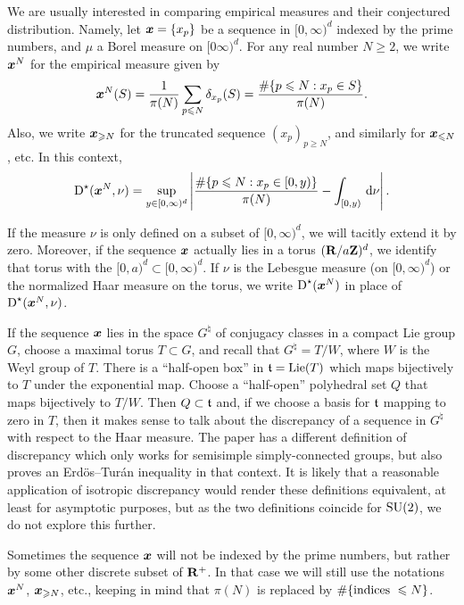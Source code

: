 We are usually interested in comparing empirical measures and their conjectured 
distribution. Namely, let ${\boldsymbol x} = \{x_p\}$ be a sequence in $[0,\infty)^d$ 
indexed by the prime numbers, and $\mu$ a Borel measure on $[0\infty)^d$. For 
any real number $N\geqslant 2$, we write ${\boldsymbol x}^N$ for the empirical measure 
given by 
\[
	{\boldsymbol x}^N(S) = \frac{1}{\pi(N)} \sum_{p\leqslant N} \delta_{x_p}(S) = \frac{\# \{p\leqslant N : x_p\in S\}}{\pi(N)} .
\]
Also, we write ${\boldsymbol x}_{\geqslant N}$ for the truncated sequence 
$(x_p)_{p\geqslant N}$, and similarly for ${\boldsymbol x}_{\leqslant N}$, etc. In this 
context, 
\[
	\operatorname{D}^\star({\boldsymbol x}^N,\nu) = \sup_{y\in [0,\infty)^d} \left| \frac{\# \{p\leqslant N : x_p \in [0,y)\}}{\pi(N)} - \int_{[0,y)} \, \mathrm{d}\nu\right| .
\]

If the measure $\nu$ is only defined on a subset of $[0,\infty)^d$, we will 
tacitly extend it by zero. Moreover, if the sequence ${\boldsymbol x}$ actually lies in a 
torus $(\mathbf{R}/a \mathbf{Z})^d$, we identify that torus with the 
$[0,a)^d\subset [0,\infty)^d$. If $\nu$ is the Lebesgue measure (on 
$[0,\infty)^d$) or the normalized Haar measure on the torus, we write 
$\operatorname{D}^\star({\boldsymbol x}^N)$ in place of $\operatorname{D}^\star({\boldsymbol x}^N, \nu)$. 

If the sequence ${\boldsymbol x}$ lies in the space $G^\natural$ of conjugacy classes in a 
compact Lie group $G$, choose a maximal torus $T\subset G$, and recall that 
$G^\natural = T/W$, where $W$ is the Weyl group of $T$. There is a ``half-open 
box'' in $\mathfrak{t} = \operatorname{Lie}(T)$ which maps bijectively to $T$ under the exponential 
map. Choose a ``half-open'' polyhedral set $Q$ that maps bijectively to $T/W$. 
Then $Q\subset \mathfrak{t}$ and, if we choose a basis for $\mathfrak{t}$ mapping to zero in 
$T$, then it makes sense to talk about the discrepancy of a sequence in 
$G^\natural$ with respect to the Haar measure. The paper 
\cite{rosengarten-2013} has a different definition of discrepancy which only 
works for semisimple simply-connected groups, but also proves an 
Erd\"os--Tur\'an inequality in that context. It is likely that a reasonable 
application of isotropic discrepancy would render these definitions equivalent, 
at least for asymptotic purposes, but as the two definitions coincide for 
$\operatorname{SU}(2)$, we do not explore this further. 

Sometimes the sequence ${\boldsymbol x}$ will not be indexed by the prime numbers, but 
rather by some other discrete subset of $\mathbf{R}^+$. In that case we will still 
use the notations ${\boldsymbol x}^N$, ${\boldsymbol x}_{\geqslant N}$, etc., keeping in mind that 
$\pi(N)$ is replaced by $\#\{\textnormal{indices }\leqslant N\}$. 





